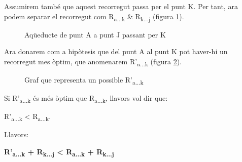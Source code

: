 \documentclass[12pt, letterpaper]{article}
\begin{document}
Assumirem també que aquest recorregut passa per el punt K. Per tant, ara podem separar el recorregut com R\textsubscript{a...k} \& R\textsubscript{k...j} (figura \ref{demostracio:atoktoj}).

\begin{figure}[htbp]
\begin{center}
\caption{Aqüeducte de punt A a punt J passant per K}
\label{demostracio:atoktoj}
\end{center}
\end{figure}

Ara donarem com a hipòtesis que del punt A al punt K pot haver-hi un recorregut mes òptim, que anomenarem R'\textsubscript{a...k} (figura \ref{demostracio:atoktojhypotetical}).

\begin{figure}[htbp]
\begin{center}
\caption{Graf que representa un possible R'\textsubscript{a...k}}
\label{demostracio:atoktojhypotetical}
\end{center}
\end{figure}

Si R'\textsubscript{a...k} és més òptim que R\textsubscript{a...k}, llavors vol dir que: \\
\begin{center}
R'\textsubscript{a...k} < R\textsubscript{a...k}.\\
\end{center}
Llavors:\\
\begin{center}
\textbf{R'\textsubscript{a...k} + R\textsubscript{k...j} < R\textsubscript{a...k} + R\textsubscript{k...j}} \\
\end{center}
\end{document}
